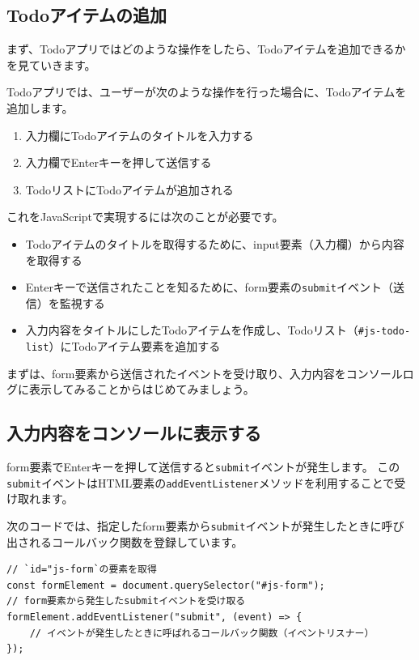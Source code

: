 \hypertarget{add-todo-item}{%
\subsection{Todoアイテムの追加}\label{add-todo-item}}

まず、Todoアプリではどのような操作をしたら、Todoアイテムを追加できるかを見ていきます。

Todoアプリでは、ユーザーが次のような操作を行った場合に、Todoアイテムを追加します。

\begin{enumerate}
\def\labelenumi{\arabic{enumi}.}
\item
  入力欄にTodoアイテムのタイトルを入力する
\item
  入力欄でEnterキーを押して送信する
\item
  TodoリストにTodoアイテムが追加される
\end{enumerate}

これをJavaScriptで実現するには次のことが必要です。

\begin{itemize}
\item
  Todoアイテムのタイトルを取得するために、input要素（入力欄）から内容を取得する
\item
  Enterキーで送信されたことを知るために、form要素の\texttt{submit}イベント（送信）を監視する
\item
  入力内容をタイトルにしたTodoアイテムを作成し、Todoリスト（\texttt{\#js-todo-list}）にTodoアイテム要素を追加する
\end{itemize}

まずは、form要素から送信されたイベントを受け取り、入力内容をコンソールログに表示してみることからはじめてみましょう。

\hypertarget{input-to-console}{%
\subsection{入力内容をコンソールに表示する}\label{input-to-console}}

form要素でEnterキーを押して送信すると\texttt{submit}イベントが発生します。
この\texttt{submit}イベントはHTML要素の\texttt{addEventListener}メソッドを利用することで受け取れます。

次のコードでは、指定したform要素から\texttt{submit}イベントが発生したときに呼び出されるコールバック関数を登録しています。

\begin{lstlisting}
// `id="js-form`の要素を取得
const formElement = document.querySelector("#js-form");
// form要素から発生したsubmitイベントを受け取る
formElement.addEventListener("submit", (event) => {
    // イベントが発生したときに呼ばれるコールバック関数（イベントリスナー）
});
\end{lstlisting}

